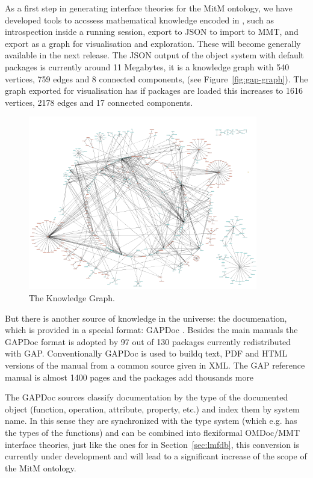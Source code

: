 As a first step in generating interface theories for the MitM ontology, we have developed
tools to accssess mathematical knowledge encoded in \GAP, such as introspection inside a
running \GAP session, export to JSON to import to MMT, and export as a graph for
visualisation and exploration. These will become generally available in the next \GAP
release. The JSON output of the \GAP object system with default packages is currently
around 11 Megabytes, it is a knowledge graph with 540 vertices, 759 edges and 8 connected
components, (see Figure~\ref{fig:gap-graph}). The graph exported for visualisation has if
packages are loaded this increases to 1616 vertices, 2178 edges and 17 connected
components.

\begin{figure}[ht]\centering
  \includegraphics[width=10cm]{gap-graph}
  \caption{The \GAP Knowledge Graph.}
\end{figure}

But there is another source of knowledge in the \GAP universe: the documenation, which is
provided in a special format: GAPDoc \cite{gapdoc}. Besides the main manuals the GAPDoc
format is adopted by 97 out of 130 packages currently redistributed with
GAP. Conventionally GAPDoc is used to buildq text, PDF and HTML versions of the manual
from a common source given in XML. The GAP reference manual is almost 1400 pages and the
packages add thousands more

The GAPDoc sources classify documentation by the type of the documented object (function,
operation, attribute, property, etc.) and index them by system name. In this sense they
are synchronized with the type system (which e.g. has the types of the functions) and can
be combined into flexiformal OMDoc/MMT interface theories, just like the ones for \LMFDB
in Section~\ref{sec:lmfdb}, this conversion is currently under development and will lead
to a significant increase of the scope of the MitM ontology. 


